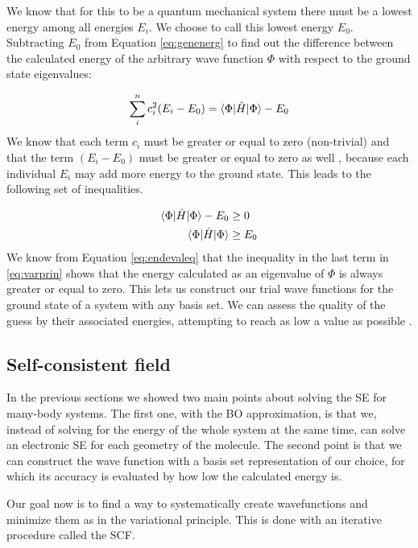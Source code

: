 \documentclass[../master_thesis.tex]{subfiles}
\begin{document}
We know that for this to be a quantum mechanical system there must be a lowest
energy among all energies $E_i$. We choose to call this lowest energy $E_0$.
Subtracting $E_0$ from Equation \ref{eq:genenerg} to find out the difference
between the calculated energy of the arbitrary wave function $\Phi$ with respect
to the ground state eigenvalues:

\begin{equation}
   \sum\limits_i^nc_i^2(E_i - E_0) = \braket{\Phi | \hat{H} | \Phi} - E_0
\end{equation}
We know that each term $c_i$ must be greater or equal to zero (non-trivial) and
that the term $(E_i - E_0)$ must be greater or equal to zero as well
\cite{Cramer:2004}, because each individual $E_i$ may add more energy to the
ground state. This leads to the following set of inequalities.

\begin{equation}
  \begin{split} \label{eq:varprin}
    \braket{\Phi | \hat{H} | \Phi} - E_0 & \geq 0 \\
    \braket{\Phi | \hat{H} | \Phi} & \geq E_0
  \end{split}
\end{equation}
We know from Equation \ref{eq:endevaleq} that the inequality in the last term in
\ref{eq:varprin} shows that the energy calculated as an eigenvalue of $\Phi$ is
always greater or equal to zero. This lets us construct our trial wave functions
for the ground state of a system with any basis set. We can assess the quality
of the guess by their associated energies, attempting to reach as low a value
as possible \cite{Cramer:2004}.

\subsection{Self-consistent field}
In the previous sections we showed two main points about solving the \ac{SE} for
many-body systems. The first one, with the \ac{BO} approximation, is that we,
instead of solving for the energy of the whole system at the same time, can solve an electronic
\ac{SE} for each geometry of the molecule. The second point is that we can construct
the wave function with a basis set representation of our choice, for which its
accuracy is evaluated by how low the calculated energy is.

Our goal now is to find a way to systematically create wavefunctions and
minimize them as in the variational principle. This is done with an iterative
procedure called the \ac{SCF}.
\end{document}
